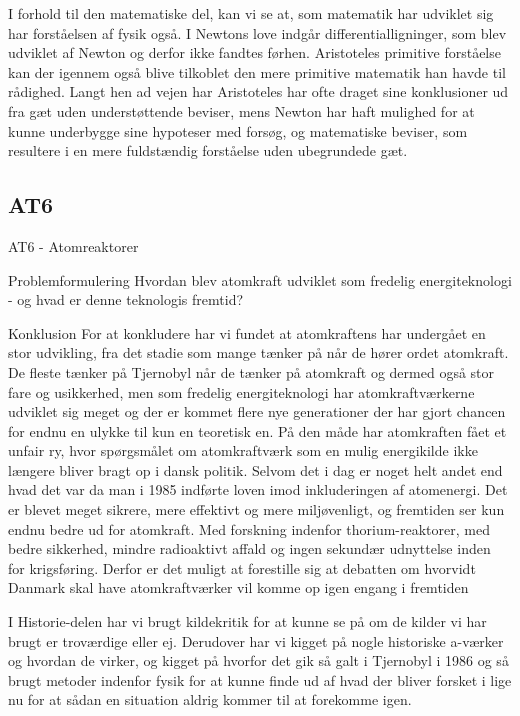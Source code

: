 \documentclass{article}
\begin{document}
I forhold til den matematiske del, kan vi se at, som matematik har udviklet sig har forståelsen af fysik også. I Newtons love indgår differentialligninger, som blev udviklet af Newton og derfor ikke fandtes førhen. Aristoteles primitive forståelse kan der igennem også blive tilkoblet den mere primitive matematik han havde til rådighed. Langt hen ad vejen har Aristoteles har ofte draget sine konklusioner ud fra gæt uden understøttende beviser, mens Newton har haft mulighed for at kunne underbygge sine hypoteser med forsøg, og matematiske beviser, som resultere i en mere fuldstændig forståelse uden ubegrundede gæt.

\subsection{AT6}

AT6 - Atomreaktorer

Problemformulering
Hvordan blev atomkraft udviklet som fredelig energiteknologi - og hvad er denne teknologis fremtid?

Konklusion
For at konkludere har vi fundet at atomkraftens har undergået en stor udvikling, fra det stadie som mange tænker på når de hører ordet atomkraft. De fleste tænker på Tjernobyl når de tænker på atomkraft og dermed også stor fare og usikkerhed, men som fredelig energiteknologi har atomkraftværkerne udviklet sig meget og der er kommet flere nye generationer der har gjort chancen for endnu en ulykke til kun en teoretisk en. På den måde har atomkraften fået et unfair ry, hvor spørgsmålet om atomkraftværk som en mulig energikilde ikke længere bliver bragt op i dansk politik. Selvom det i dag er noget helt andet end hvad det var da man i 1985 indførte loven imod inkluderingen af atomenergi. Det er blevet meget sikrere, mere effektivt og mere miljøvenligt, og fremtiden ser kun endnu bedre ud for atomkraft. Med forskning indenfor thorium-reaktorer, med bedre sikkerhed, mindre radioaktivt affald og ingen sekundær udnyttelse inden for krigsføring. Derfor er det muligt at forestille sig at debatten om hvorvidt Danmark skal have atomkraftværker vil komme op igen engang i fremtiden

I Historie-delen har vi brugt kildekritik for at kunne se på om de kilder vi har brugt er troværdige eller ej. Derudover har vi kigget på nogle historiske a-værker og hvordan de virker, og kigget på hvorfor det gik så galt i Tjernobyl i 1986 og så brugt metoder indenfor fysik for at kunne finde ud af hvad der bliver forsket i lige nu for at sådan en situation aldrig kommer til at forekomme igen.
\end{document}
